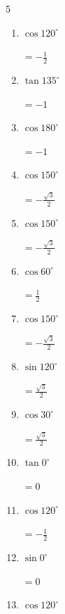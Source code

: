 \begin{multicols}{5}
\begin{enumerate}
        $\displaystyle =\frac{1}{\sqrt{2}}$

  \item $\displaystyle \cos{120^\circ}$

        $\displaystyle =-\frac{1}{2}$

  \item $\displaystyle \tan{135^\circ}$

        $\displaystyle =-1$

  \item $\displaystyle \cos{180^\circ}$

        $\displaystyle =-1$

  \item $\displaystyle \cos{150^\circ}$

        $\displaystyle =-\frac{\sqrt{3}}{2}$

  \item $\displaystyle \cos{150^\circ}$

        $\displaystyle =-\frac{\sqrt{3}}{2}$

  \item $\displaystyle \cos{60^\circ}$

        $\displaystyle =\frac{1}{2}$

  \item $\displaystyle \cos{150^\circ}$

        $\displaystyle =-\frac{\sqrt{3}}{2}$

  \item $\displaystyle \sin{120^\circ}$

        $\displaystyle =\frac{\sqrt{3}}{2}$

  \item $\displaystyle \cos{30^\circ}$

        $\displaystyle =\frac{\sqrt{3}}{2}$

  \item $\displaystyle \tan{0^\circ}$

        $\displaystyle =0$

  \item $\displaystyle \cos{120^\circ}$

        $\displaystyle =-\frac{1}{2}$

  \item $\displaystyle \sin{0^\circ}$

        $\displaystyle =0$

\columnbreak %

  \item $\displaystyle \cos{120^\circ}$


\end{enumerate}
\end{multicols}

